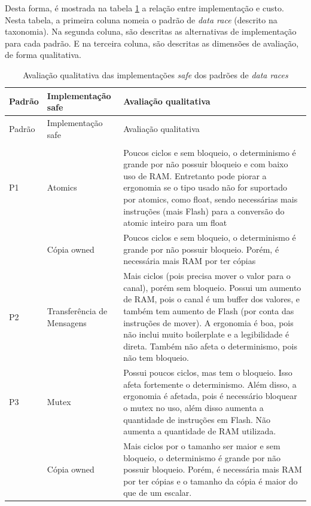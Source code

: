 Desta forma, é mostrada na tabela \ref{tab:cost-impl} a relação entre implementação e custo. Nesta tabela, a primeira coluna nomeia o padrão de \textit{data race} (descrito na taxonomia). Na segunda coluna, são descritas as alternativas de implementação para cada padrão. E na terceira coluna, são descritas as dimensões de avaliação, de forma qualitativa.

\begin{longtable}{>{\raggedright\arraybackslash}p{} >{\raggedright\arraybackslash}p{} >{\raggedright\arraybackslash}p{}}
  \caption{Avaliação qualitativa das implementações \textit{safe} dos padrões de \textit{data races}}\label{tab:cost-impl}\\
  \toprule
  Padrão & Implementação safe & Avaliação qualitativa \\
  \midrule
  \endfirsthead
  \toprule
  Padrão & Implementação safe & Avaliação qualitativa \\
  \midrule
  \endhead
  \midrule
  \multicolumn{3}{r}{\footnotesize continua na próxima página} \\
  \endfoot
  \bottomrule
  \endlastfoot
  P1 & Atomics & Poucos ciclos e sem bloqueio, o determinismo é grande por não possuir bloqueio e com baixo uso de RAM. Entretanto pode piorar a ergonomia se o tipo usado não for suportado por atomics, como float, sendo necessárias mais instruções (mais Flash) para a conversão do atomic inteiro para um float \\
     & Cópia owned & Poucos ciclos e sem bloqueio, o determinismo é grande por não possuir bloqueio. Porém, é necessária mais RAM por ter cópias \\
  \hline
  P2 & Transferência de Mensagens & Mais ciclos (pois precisa mover o valor para o canal), porém sem bloqueio. Possui um aumento de RAM, pois o canal é um buffer dos valores, e também tem aumento de Flash (por conta das instruções de mover). A ergonomia é boa, pois não inclui muito boilerplate e a legibilidade é direta. Também não afeta o determinismo, pois não tem bloqueio. \\
  \hline
  P3 & Mutex & Possui poucos ciclos, mas tem o bloqueio. Isso afeta fortemente o determinismo. Além disso, a ergonomia é afetada, pois é necessário bloquear o mutex no uso, além disso aumenta a quantidade de instruções em Flash. Não aumenta a quantidade de RAM utilizada. \\
     & Cópia owned & Mais ciclos por o tamanho ser maior e sem bloqueio, o determinismo é grande por não possuir bloqueio. Porém, é necessária mais RAM por ter cópias e o tamanho da cópia é maior do que de um escalar. \\

\end{longtable}

